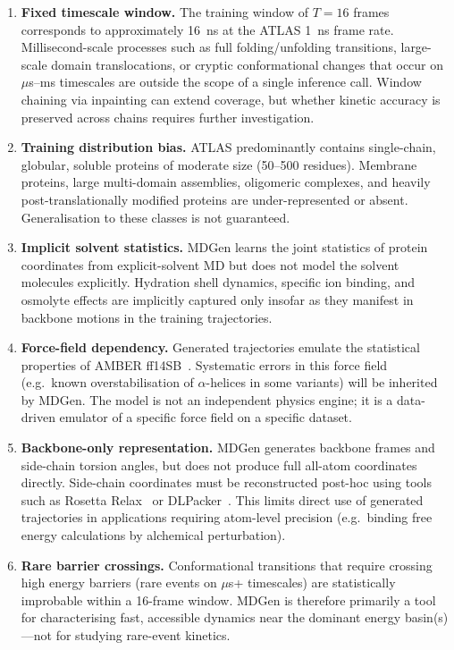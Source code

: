 \documentclass[11pt,a4paper]{article}
\begin{document}
\begin{enumerate}[leftmargin=2em]
  \item \textbf{Fixed timescale window.}  The training window of $T = 16$ frames corresponds to
    approximately 16~ns at the ATLAS 1~ns frame rate.  Millisecond-scale processes such as full
    folding/unfolding transitions, large-scale domain translocations, or cryptic conformational
    changes that occur on $\mu$s--ms timescales are outside the scope of a single inference
    call.  Window chaining via inpainting can extend coverage, but whether kinetic accuracy is
    preserved across chains requires further investigation.

  \item \textbf{Training distribution bias.}  ATLAS predominantly contains single-chain, globular,
    soluble proteins of moderate size (50--500 residues).  Membrane proteins, large multi-domain
    assemblies, oligomeric complexes, and heavily post-translationally modified proteins are
    under-represented or absent.  Generalisation to these classes is not guaranteed.

  \item \textbf{Implicit solvent statistics.}  MDGen learns the joint statistics of protein
    coordinates from explicit-solvent MD but does not model the solvent molecules explicitly.
    Hydration shell dynamics, specific ion binding, and osmolyte effects are implicitly captured
    only insofar as they manifest in backbone motions in the training trajectories.

  \item \textbf{Force-field dependency.}  Generated trajectories emulate the statistical properties
    of AMBER ff14SB~\cite{maier2015}.  Systematic errors in this force field (e.g.\ known
    overstabilisation of $\alpha$-helices in some variants) will be inherited by MDGen.  The model
    is not an independent physics engine; it is a data-driven emulator of a specific force field
    on a specific dataset.

  \item \textbf{Backbone-only representation.}  MDGen generates backbone frames and side-chain
    torsion angles, but does not produce full all-atom coordinates directly.  Side-chain
    coordinates must be reconstructed post-hoc using tools such as Rosetta Relax~\cite{conway2014}
    or DLPacker~\cite{xiong2022}.  This limits direct use of generated trajectories in applications
    requiring atom-level precision (e.g.\ binding free energy calculations by alchemical
    perturbation).

  \item \textbf{Rare barrier crossings.}  Conformational transitions that require crossing high
    energy barriers (rare events on $\mu$s+ timescales) are statistically improbable within a
    16-frame window.  MDGen is therefore primarily a tool for characterising fast, accessible
    dynamics near the dominant energy basin(s)---not for studying rare-event kinetics.
\end{enumerate}
\end{document}
